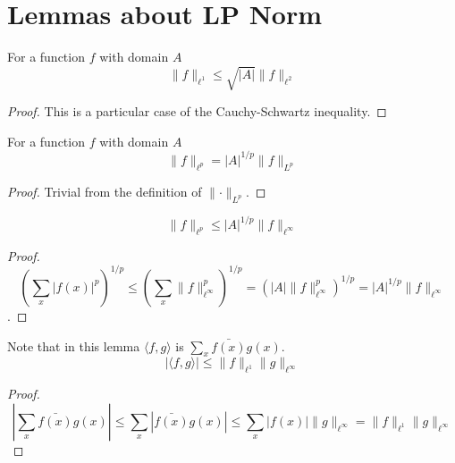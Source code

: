 \chapter{Lemmas about LP Norm}
\label{chap:lplemmas}

\begin{theorem}
    \label{l1Norm_le_sqrt_card_mul_l2Norm}
    \leanok
    For a function $f$ with domain $A$
    $$\lVert f \rVert_{\ell^1} \leq \sqrt{|A|} \lVert f \rVert_{\ell^2}$$
\end{theorem}

\begin{proof}
    \leanok
    This is a particular case of the Cauchy-Schwartz inequality.
\end{proof}


\begin{lemma}
    \label{lpNorm_eq_card_rpow_mul_nlpNorm}
    \leanok
    For a function $f$ with domain $A$
    $$\lVert f \rVert_{\ell^p} = |A|^{1/p} \lVert f \rVert_{L^p}$$
\end{lemma}

\begin{proof}
    \leanok
    Trivial from the definition of $\lVert \cdot \rVert_{L^p}$.
\end{proof}

\begin{lemma}
    \label{lpNorm_le_card_rpow_mul_linftyNorm}
    \leanok
    $$\lVert f \rVert_{\ell^p} \leq |A|^{1/p} \lVert f \rVert_{\ell^\infty}$$
\end{lemma}

\begin{proof}
    \leanok
    $$(\sum_{x} |f(x)|^p)^{1/p} \leq (\sum_{x} \lVert f \rVert_{\ell^\infty}^p)^{1/p} = (|A| \lVert f \rVert_{\ell^\infty}^p)^{1/p} =
    |A|^{1/p} \lVert f \rVert_{\ell^\infty}$$.
\end{proof}

\begin{lemma}
    \label{l2Inner_le_l1Norm_mul_linftyNorm}
    \leanok
    Note that in this lemma $\langle f, g \rangle$ is $\sum_x \bar{f(x)} {g(x)}$.
    $$|\langle f, g \rangle| \leq \lVert f \rVert_{\ell^1} \lVert g \rVert_{\ell^\infty}$$
\end{lemma}

\begin{proof}
    \leanok
    $$|\sum_x \bar{f(x)} {g(x)}| \leq \sum_x |\bar{f(x)} {g(x)}| \leq \sum_x |f(x)| \lVert g \rVert_{\ell^\infty} =
    \lVert f \rVert_{\ell^1} \lVert g \rVert_{\ell^\infty}$$
\end{proof}

